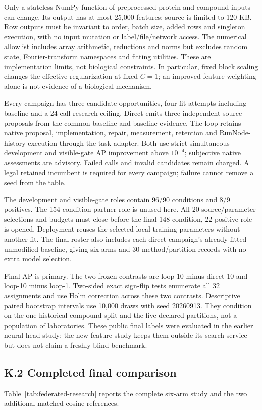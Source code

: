 Only a stateless NumPy function of preprocessed protein and compound inputs can change. Its output has at most 25,000 features; source is limited to 120 KB. Row outputs must be invariant to order, batch size, added rows and singleton execution, with no input mutation or label/file/network access. The numerical allowlist includes array arithmetic, reductions and norms but excludes random state, Fourier-transform namespaces and fitting utilities. These are implementation limits, not biological constraints. In particular, fixed block scaling changes the effective regularization at fixed $C=1$; an improved feature weighting alone is not evidence of a biological mechanism.

Every campaign has three candidate opportunities, four fit attempts including baseline and a 24-call research ceiling. Direct emits three independent source proposals from the common baseline and baseline evidence. The loop retains native proposal, implementation, repair, measurement, retention and RunNode-history execution through the task adapter. Both use strict simultaneous development and visible-gate AP improvement above $10^{-4}$; subjective native assessments are advisory. Failed calls and invalid candidates remain charged. A legal retained incumbent is required for every campaign; failure cannot remove a seed from the table.

The development and visible-gate roles contain 96/90 conditions and 8/9 positives. The 154-condition partner role is unused here. All 20 source/parameter selections and budgets must close before the final 148-condition, 22-positive role is opened. Deployment reuses the selected local-training parameters without another fit. The final roster also includes each direct campaign's already-fitted unmodified baseline, giving six arms and 30 method/partition records with no extra model selection.

Final AP is primary. The two frozen contrasts are loop-10 minus direct-10 and loop-10 minus loop-1. Two-sided exact sign-flip tests enumerate all 32 assignments and use Holm correction across these two contrasts. Descriptive paired bootstrap intervals use 10,000 draws with seed 20260913. They condition on the one historical compound split and the five declared partitions, not a population of laboratories. These public final labels were evaluated in the earlier neural-head study; the new feature study keeps them outside its search service but does not claim a freshly blind benchmark.

\subsection*{K.2 Completed final comparison}
Table~\ref{tab:federated-research} reports the complete six-arm study and the two additional matched cosine references.

